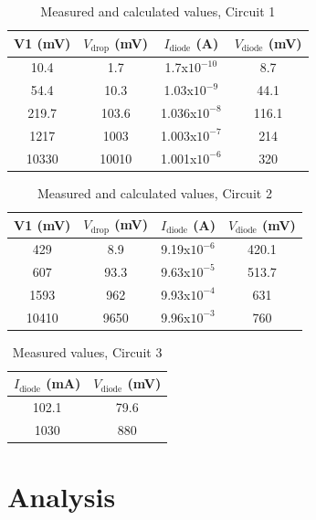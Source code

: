 \documentclass[12pt,letterpaper]{report}
\begin{document}
\begin{table}[ht]
\caption{Measured and calculated values, Circuit 1} %
\centering 
    \begin{tabular}{| c | c | c | c |}
    \hline  
    V1 (mV) & $V_{\text{drop}}$ (mV) & $I_{\text{diode}}$ (A) & $V_{\text{diode}}$ (mV) \\
    \hline
    10.4 & 1.7 & 1.7x$10^{-10}$ & 8.7 \\
    54.4 & 10.3 & 1.03x$10^{-9}$ & 44.1\\
    219.7 & 103.6 & 1.036x$10^{-8}$ & 116.1\\
    1217 & 1003 & 1.003x$10^{-7}$ & 214\\
    10330 & 10010 & 1.001x$10^{-6}$ & 320\\
    \hline
    \end{tabular}
    \label{table:circuit_1}
\end{table}

\begin{table}[ht]
\caption{Measured and calculated values, Circuit 2} %
\centering 
    \begin{tabular}{| c | c | c | c |}
    \hline  
    V1 (mV) & $V_{\text{drop}}$ (mV) & $I_{\text{diode}}$ (A) & $V_{\text{diode}}$ (mV) \\
    \hline
    429 & 8.9 & 9.19x$10^{-6}$ & 420.1 \\
    607 & 93.3 & 9.63x$10^{-5}$ & 513.7\\
    1593 & 962 & 9.93x$10^{-4}$ & 631\\
    10410 & 9650 & 9.96x$10^{-3}$ & 760\\
    \hline
    \end{tabular}
    \label{table:circuit_2}
\end{table}

\begin{table}[ht]
\caption{Measured values, Circuit 3} %
\centering 
    \begin{tabular}{| c | c |}
    \hline  
    $I_{\text{diode}}$ (mA) & $V_{\text{diode}}$ (mV) \\
    \hline
    102.1 & 79.6 \\
    1030 & 880\\
    \hline
    \end{tabular}
    \label{table:circuit_3}
\end{table}

\section*{Analysis}
\end{document}
